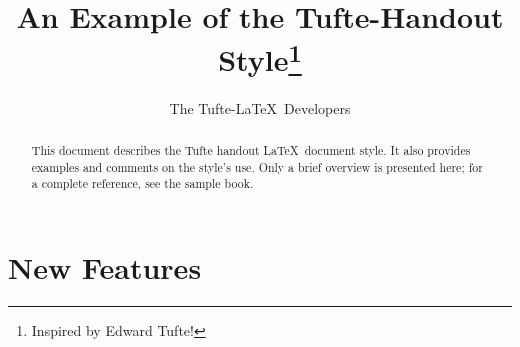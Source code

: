 \documentclass[a4paper]{tufte-handout}
\title{An Example of the Tufte-Handout Style\thanks{Inspired by Edward Tufte!}}
\author[The Tufte-LaTeX Developers]{The Tufte-\LaTeX\ Developers}
\begin{document}
\maketitle

\begin{abstract}
  \noindent
  This document describes the Tufte handout \LaTeX\ document style.
  It also provides examples and comments on the style's use.
  Only a brief overview is presented here;
  for a complete reference, see the sample book.
\end{abstract}

\section{New Features}
\end{document}
